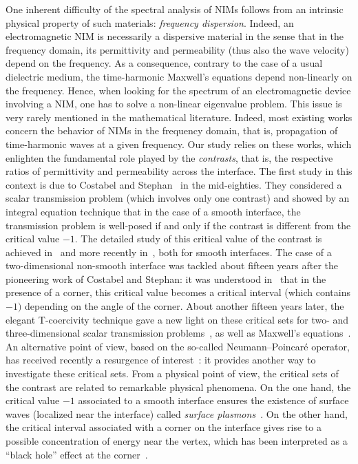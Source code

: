 One inherent difficulty of the spectral analysis of NIMs follows from an intrinsic physical property of such materials: \emph{frequency dispersion}. Indeed, an electromagnetic NIM is necessarily a dispersive material in the sense that in the frequency domain, its permittivity and permeability (thus also the wave velocity) depend on the frequency. As a consequence, contrary to the case of a usual dielectric medium, the time-harmonic Maxwell's equations depend non-linearly on the frequency. Hence, when looking for the spectrum of an electromagnetic device involving a NIM, one has to solve a non-linear eigenvalue problem. This issue is very rarely mentioned in the mathematical literature. Indeed, most existing works concern the behavior of NIMs in the frequency domain, that is, propagation of time-harmonic waves at a given frequency. Our study relies on these works, which enlighten the fundamental role played by the \emph{contrasts}, that is, the respective ratios of permittivity and permeability across the interface. The first study in this context is due to Costabel and Stephan~\cite{Cos-Ste-85} in the mid-eighties. They considered a scalar transmission problem (which involves only one contrast) and showed by an integral equation technique that in the case of a smooth interface, the transmission problem is well-posed if and only if the contrast is different from the critical value $-1.$ The detailed study of this critical value of the contrast is achieved in~\cite{Ola-95} and more recently in~\cite{Cac-Pan-Pos}, both for smooth interfaces. The case of a two-dimensional non-smooth interface was tackled about fifteen years after the pioneering work of Costabel and Stephan: it was understood in~\cite{Bon-Dau-Ram-99} that in the presence of a corner, this critical value becomes a critical interval (which contains $-1)$ depending on the angle of the corner. About another fifteen years later, the elegant T-coercivity technique gave a new light on these critical sets for two- and three-dimensional scalar transmission problems~\cite{Bon-Che-Cia-12,Ngu-16}, as well as Maxwell's equations~\cite{Bon-Che-Cia-14a,Bon-Che-Cia-14b}. An alternative point of view, based on the so-called Neumann--Poincaré operator, has received recently a resurgence of interest~\cite{Amm-etal-13,And-Kan-16,Amm-Mil-Rui-Zha-17,Bon-Zha-17,Per-Put-17}: it provides another way to investigate these critical sets. From a physical point of view, the critical sets of the contrast are related to remarkable physical phenomena. On the one hand, the critical value $-1$ associated to a smooth interface ensures the existence of surface waves (localized near the interface) called \emph{surface plasmons}~\cite{Gra-May-12,Gri-14}. On the other hand, the critical interval associated with a corner on the interface gives rise to a possible concentration of energy near the vertex, which has been interpreted as a ``black hole'' effect at the corner~\cite{Bon-etal-16}.

